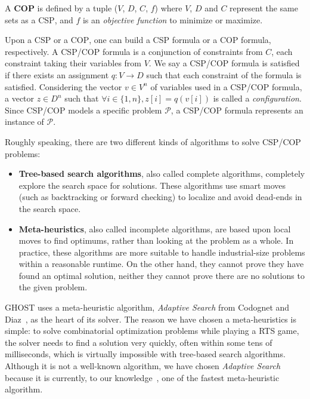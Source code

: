 \documentclass[journal]{IEEEtran}
\newcommand{\minormod}[1]{\color{red} #1\color{black} \xspace}
\newcommand{\csp}{\textsc{CSP}\xspace}
\newcommand{\cop}{\textsc{COP}\xspace}
\newcommand{\ghost}{\textsc{GHOST}\xspace}
\begin{document}
A {\bf \cop} is defined by a tuple ($V$, $D$, $C$, $f$) where $V$, $D$ and
$C$ represent the same sets as a \csp, and $f$ is an {\it objective
function} to minimize  or maximize.

Upon a \csp or a \cop, one can build a \csp formula or a \cop formula,
respectively.   A \csp/\cop  formula is  a conjunction  of constraints
from $C$,  each constraint taking their  variables from $V$. We  say a
\csp/\cop formula  is satisfied  if there exists  an assignment  $q: V
\rightarrow  D$   such  that each   constraint  of  the   formula  is
satisfied. Considering the  vector $v \in V^n$ of variables  used in a
\csp/\cop formula, a vector $z \in D^n$ such that
$\forall i \in \{1,n\}, z[i] = q(v[i])$
is called a {\it configuration}.  Since
\csp/\cop models a specific problem $\mathcal{P}$, a \csp/\cop formula
represents an instance of $\mathcal{P}$.

Roughly speaking,  there are  two different  kinds of  algorithms to
solve \csp/\cop problems:
\begin{itemize}
\item \textbf{Tree-based  search algorithms}, also called complete 
algorithms, completely explore the search space for solutions.  
These algorithms use smart moves (such as backtracking or forward checking) 
to localize and avoid dead-ends in the search space.
\item \textbf{Meta-heuristics},  also called incomplete algorithms,  
  are based upon local moves to  find optimums, rather than looking at
  the problem as  a whole. In practice, these algorithms  are 
  \minormod{more suitable to handle}
  industrial-size  problems   within  a
  reasonable runtime. On  the other hand, they cannot  prove they have
  found an  optimal solution, neither  they cannot prove there  are no
  solutions to the given problem.
\end{itemize}

\ghost uses a meta-heuristic algorithm, \emph{Adaptive Search} from
Codognet and Diaz~\cite{Codognet01}, as the heart of its solver.  The
reason we have chosen a meta-heuristics is simple: to solve
combinatorial optimization problems while playing a RTS game, the
solver needs to find a solution very quickly, often within some tens of
milliseconds, which is virtually impossible with tree-based search
algorithms. Although it is not a well-known algorithm, we have chosen
{\it Adaptive Search} because it is currently, to our knowledge~\cite{Caniou14}, 
one of the fastest meta-heuristic algorithm.
\end{document}
